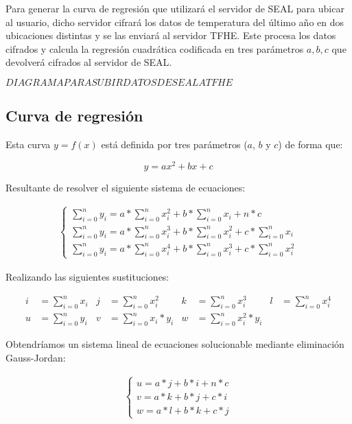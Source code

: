 Para generar la curva de regresión que utilizará el servidor de SEAL para ubicar al usuario, dicho servidor cifrará los datos de temperatura del último año en dos ubicaciones distintas y se las enviará al servidor TFHE. Este procesa los datos cifrados y calcula la regresión cuadrática codificada en tres parámetros $a, b, c$ que devolverá cifrados al servidor de SEAL.

$ DIAGRAMA PARA SUBIR DATOS DE SEAL A TFHE$

\subsection{Curva de regresión}

Esta curva $ y = f(x) $ está definida por tres parámetros ($a$, $b$ y $c$) de forma que:

\[ y = ax^2 + bx + c \]

Resultante de resolver el siguiente sistema de ecuaciones:

\begin{gather*}
    \begin{cases}
        \sum_{i=0}^n y_i = a*\sum_{i=0}^n x_i^2 + b*\sum_{i=0}^n x_i + n*c \\
        \sum_{i=0}^n y_i = a*\sum_{i=0}^n x_i^3 + b*\sum_{i=0}^n x_i^2 + c*\sum_{i=0}^n x_i \\
        \sum_{i=0}^n y_i = a*\sum_{i=0}^n x_i^4 + b*\sum_{i=0}^n x_i^3 + c*\sum_{i=0}^n x_i^2
    \end{cases}
\end{gather*}

Realizando las siguientes sustituciones:

\begin{align*}
    i &= \sum_{i=0}^n x_i & j &= \sum_{i=0}^n x_i^2 & k &= \sum_{i=0}^n x_i^3 & l &= \sum_{i=0}^n x_i^4 \\
    u &= \sum_{i=0}^n y_i & v &= \sum_{i=0}^n x_i * y_i & w &= \sum_{i=0}^n x_i^2 * y_i
\end{align*}

Obtendríamos un sistema lineal de ecuaciones solucionable mediante eliminación Gauss-Jordan:

\begin{gather*}
    \begin{cases}
        u = a*j + b*i + n*c \\
        v = a*k + b*j + c*i \\
        w = a*l + b*k + c*j
    \end{cases}
\end{gather*}


